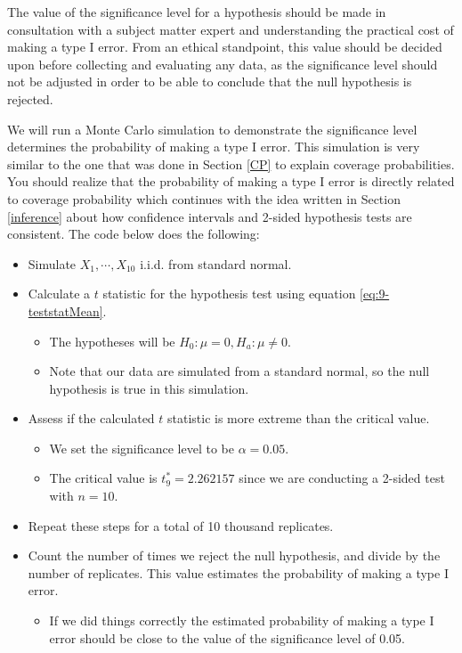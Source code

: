 \documentclass[
]{book}
\providecommand{\tightlist}{%
  \setlength{\itemsep}{0pt}\setlength{\parskip}{0pt}}
\begin{document}
The value of the significance level for a hypothesis should be made in consultation with a subject matter expert and understanding the practical cost of making a type I error. From an ethical standpoint, this value should be decided upon before collecting and evaluating any data, as the significance level should not be adjusted in order to be able to conclude that the null hypothesis is rejected.

We will run a Monte Carlo simulation to demonstrate the significance level determines the probability of making a type I error. This simulation is very similar to the one that was done in Section \ref{CP} to explain coverage probabilities. You should realize that the probability of making a type I error is directly related to coverage probability which continues with the idea written in Section \ref{inference} about how confidence intervals and 2-sided hypothesis tests are consistent. The code below does the following:

\begin{itemize}
\tightlist
\item
  Simulate \(X_1, \cdots, X_{10}\) i.i.d. from standard normal.
\item
  Calculate a \(t\) statistic for the hypothesis test using equation \eqref{eq:9-teststatMean}.

  \begin{itemize}
  \tightlist
  \item
    The hypotheses will be \(H_0: \mu = 0, H_a: \mu \neq 0\).
  \item
    Note that our data are simulated from a standard normal, so the null hypothesis is true in this simulation.
  \end{itemize}
\item
  Assess if the calculated \(t\) statistic is more extreme than the critical value.

  \begin{itemize}
  \tightlist
  \item
    We set the significance level to be \(\alpha = 0.05\).
  \item
    The critical value is \(t_9^* = 2.262157\) since we are conducting a 2-sided test with \(n=10\).
  \end{itemize}
\item
  Repeat these steps for a total of 10 thousand replicates.
\item
  Count the number of times we reject the null hypothesis, and divide by the number of replicates. This value estimates the probability of making a type I error.

  \begin{itemize}
  \tightlist
  \item
    If we did things correctly the estimated probability of making a type I error should be close to the value of the significance level of 0.05.
  \end{itemize}
\end{itemize}
\end{document}
